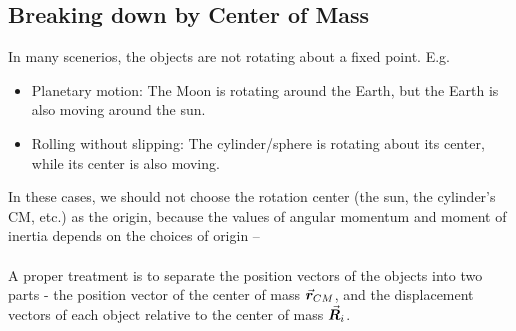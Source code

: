 \documentclass[class=article, crop=false, 12pt]{standalone}
\begin{document}
\subsection{Breaking down by Center of Mass}

In many scenerios, the objects are not rotating about a fixed point. E.g. 
\begin{itemize}
    \item Planetary motion: The Moon is rotating around the Earth, but the Earth is also moving around the sun.
    \item Rolling without slipping: The cylinder/sphere is rotating about its center, while its center is also moving.
\end{itemize}

In these cases, we should not choose the rotation center (the sun, the cylinder's CM, etc.) as the origin, 
because the values of angular momentum and moment of inertia depends on the choices of origin -- 
\\\\
A proper treatment is to separate the position vectors of the objects into two parts - 
the position vector of the center of mass $\va*{r}_{CM}$, and the displacement vectors of each object relative to the center of mass $\va*{R}_{i}$.

\end{document}
